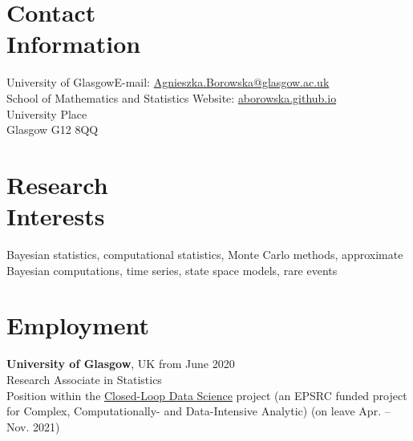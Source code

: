 \documentclass[margin,line]{resume}
\begin{document}
\begin{resume}
    \section{\mysidestyle Contact\\Information}
    University of Glasgow\hfill  E-mail: \url{Agnieszka.Borowska@glasgow.ac.uk} \\
    School of Mathematics and Statistics \hfill Website: \url{aborowska.github.io}\\ \vspace{0mm}%
    University Place \\
    Glasgow G12 8QQ\\ \vspace{-4.6mm}%
    \section{\mysidestyle Research\\Interests}
    
    Bayesian statistics, computational statistics, Monte Carlo methods, approximate Bayesian computations, time series, state space models, rare events
\vspace{-1mm}   
 
    \section{\mysidestyle Employment }
    \textbf{University of Glasgow},  UK \hfill from June 2020\\
	Research Associate in Statistics\\ 
    Position within the \href{https://www.gla.ac.uk/schools/computing/research/researchsections/ida-section/closedloop/}{Closed-Loop Data Science} project (an EPSRC funded project for Complex, Computationally- and Data-Intensive Analytic)
    (on leave Apr. -- Nov. 2021)
    \vspace{-2mm}


\end{resume}
\end{document}
